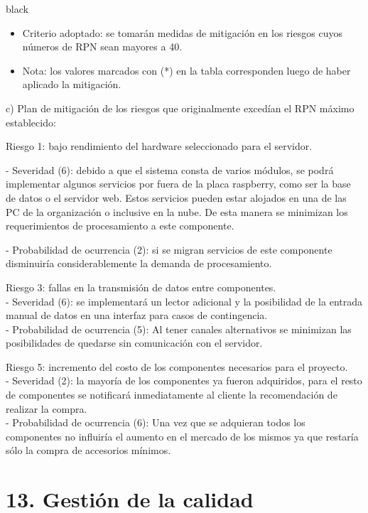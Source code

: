 \documentclass[11pt]{charter}
\begin{document}
\begin{consigna}{black}
\begin{itemize}

\item Criterio adoptado: 
se tomarán medidas de mitigación en los riesgos cuyos números de RPN sean mayores a 40.

\item Nota: los valores marcados con (*) en la tabla corresponden luego de haber aplicado la mitigación.

\end{itemize}
c) Plan de mitigación de los riesgos que originalmente excedían el RPN máximo establecido:
 

Riesgo 1: bajo rendimiento del hardware seleccionado para el servidor.

- Severidad (6): debido a que el sistema consta de varios módulos, se podrá implementar algunos servicios por fuera de la placa raspberry, como ser la base de datos o el servidor web. Estos servicios pueden estar alojados en una de las PC de la organización o inclusive en la nube. De esta manera se minimizan los requerimientos de procesamiento a este componente.

- Probabilidad de ocurrencia (2): si se migran servicios de este componente disminuiría considerablemente la demanda de procesamiento.

Riesgo 3: fallas en la transmisión de datos entre componentes.
 \\- Severidad (6): se implementará un lector adicional y la posibilidad de la entrada manual de datos en una interfaz para casos de contingencia.
 \\- Probabilidad de ocurrencia (5): Al tener canales alternativos se minimizan las posibilidades de quedarse sin comunicación con el servidor.
 
Riesgo 5: incremento del costo de los componentes necesarios para el proyecto.
\\- Severidad (2): la mayoría de los componentes ya fueron adquiridos, para el resto de componentes se notificará inmediatamente al cliente la recomendación de realizar la compra.
 \\- Probabilidad de ocurrencia (6): Una vez que se adquieran todos los componentes no influiría el aumento en el mercado de los mismos ya que restaría sólo la compra de accesorios mínimos.

\end{consigna}


\section{13. Gestión de la calidad}
\label{sec:calidad}
\end{document}
